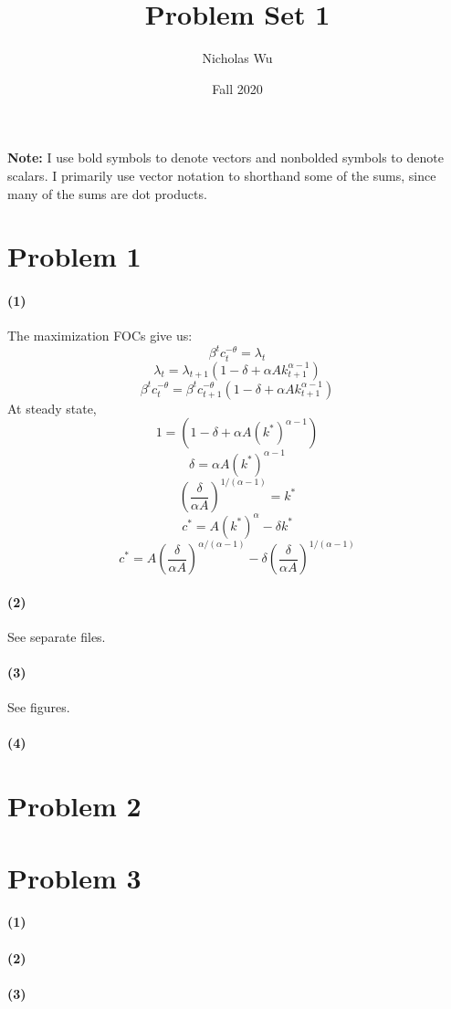 \documentclass[10pt,letter]{article}
\newcommand{\problem}[1]{\section*{Problem #1}}
\newcommand{\problempart}[1]{\paragraph{#1}}
\begin{document}


\title{Problem Set 1}

\author{Nicholas Wu}

\date{Fall 2020}

\maketitle
\textbf{Note:} I use bold symbols to denote vectors and nonbolded symbols to denote scalars. I primarily use vector notation to shorthand some of the sums, since many of the sums are dot products.

\problem{1}

\problempart{(1)}
The maximization FOCs give us:
 \[ \beta^t c_t^{-\theta} = \lambda_t  \]
 \[ \lambda_t = \lambda_{t+1}(1-\delta + \alpha A k_{t+1}^{\alpha-1})\]
 \[ \beta^t c_t^{-\theta} = \beta^t c^{-\theta}_{t+1}(1-\delta + \alpha A k_{t+1}^{\alpha-1})\]
 At steady state,
 \[1 = (1-\delta + \alpha A (k^*)^{\alpha-1}) \]
 \[ \delta = \alpha A (k^*)^{\alpha-1} \]
 \[ \left(\frac{\delta}{\alpha A}\right)^{1/(\alpha-1)} = k^*\]
 \[ c^* = A(k^*)^\alpha - \delta k^* \]
 \[ c^* = A\left(\frac{\delta}{\alpha A}\right)^{\alpha/(\alpha-1)} - \delta \left(\frac{\delta}{\alpha A}\right)^{1/(\alpha-1)} \]
\problempart{(2)}
See separate files.
\problempart{(3)}
See figures.
\problempart{(4)}


\pagebreak

\problem{2}
\pagebreak 
\problem{3}
\problempart{(1)}
\problempart{(2)}
\problempart{(3)}
\end{document}
